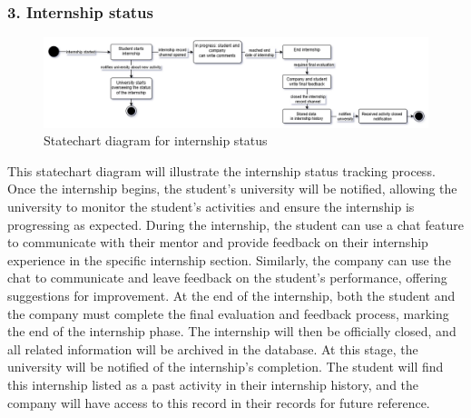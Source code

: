 \subsubsection{3. Internship status}\label{subsubsec:monitoring_student_activities}
\begin{figure}[H]
    \centering
    \includegraphics[width=1\textwidth]{Images/Internship_status.png}
    \caption{Statechart diagram for internship status}\label{fig:statechart_internship_status}
\end{figure}
This statechart diagram will illustrate the internship status tracking process. Once the internship begins, the student’s university will be notified, 
allowing the university to monitor the student’s activities and ensure the internship is progressing as expected.
During the internship, the student can use a chat feature to communicate with their mentor and provide feedback on their internship experience in the 
specific internship section. Similarly, the company can use the chat to communicate and leave feedback on the student’s performance, offering suggestions
for improvement.
At the end of the internship, both the student and the company must complete the final evaluation and feedback process, marking the end of the internship phase.
The internship will then be officially closed, and all related information will be archived in the database. At this stage, the university will be notified
of the internship’s completion.
The student will find this internship listed as a past activity in their internship history, and the company will have access to this record in their records
 for future reference.

